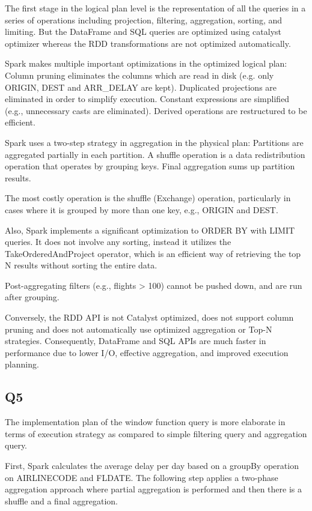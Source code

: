 \documentclass{article}
\begin{document}
The first stage in the logical plan level is the representation of all the queries in a series of operations including projection, filtering, aggregation, sorting, and limiting. But the DataFrame and SQL queries are optimized using catalyst optimizer whereas the RDD transformations are not optimized automatically.

Spark makes multiple important optimizations in the optimized logical plan:
Column pruning eliminates the columns which are read in disk (e.g. only ORIGIN, DEST and ARR\_DELAY are kept).
Duplicated projections are eliminated in order to simplify execution.
Constant expressions are simplified (e.g., unnecessary casts are eliminated).
Derived operations are restructured to be efficient.

Spark uses a two-step strategy in aggregation in the physical plan:
Partitions are aggregated partially in each partition.
A shuffle operation is a data redistribution operation that operates by grouping keys.
Final aggregation sums up partition results.

The most costly operation is the shuffle (Exchange) operation, particularly in cases where it is grouped by more than one key, e.g., ORIGIN and DEST.

Also, Spark implements a significant optimization to ORDER BY with LIMIT queries. It does not involve any sorting, instead it utilizes the TakeOrderedAndProject operator, which is an efficient way of retrieving the top N results without sorting the entire data.

Post-aggregating filters (e.g., flights > 100) cannot be pushed down, and are run after grouping.

Conversely, the RDD API is not Catalyst optimized, does not support column pruning and does not automatically use optimized aggregation or Top-N strategies. Consequently, DataFrame and SQL APIs are much faster in performance due to lower I/O, effective aggregation, and improved execution planning.
\subsection{Q5}
The implementation plan of the window function query is more elaborate in terms of execution strategy as compared to simple filtering query and aggregation query.

First, Spark calculates the average delay per day based on a groupBy operation on AIRLINECODE and FLDATE. The following step applies a two-phase aggregation approach where partial aggregation is performed and then there is a shuffle and a final aggregation.
\end{document}
